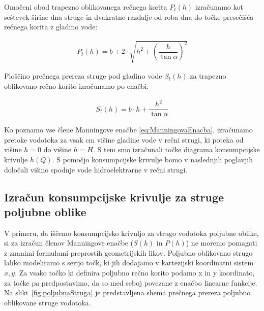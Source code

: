 \begin{enumerate}
	Omočeni obod trapezno oblikovanega rečnega korita $P_t(h)$ izračunamo kot seštevek širine dna struge in dvakratne razdalje od roba dna do točke presečišča rečnega korita z gladino vode:
	
	\begin{ceqn}
	\begin{align}
	P_{t}(h) = b + 2 \cdot \sqrt{h^2 + \left(\dfrac{h} {\tan\alpha} \right)^{2}}
	\end{align}
	\end{ceqn}
	
	Ploščino prečnega prereza struge pod gladino vode $S_t(h)$ za trapezno oblikovano rečno korito izračunamo po enačbi:
	\begin{ceqn}
	\begin{align}
	S_{t}(h) = b \cdot h + \dfrac{h^2}{\tan\alpha}
	\end{align}
	\end{ceqn}
	
\end{enumerate}



Ko poznamo vse člene Manningove enačbe \ref{eq:ManningovaEnacba}, izračunamo pretoke vodotoka za vsak cm višine gladine vode v rečni strugi, ki poteka od višine $h=0$ do višine $h=H$. S tem smo izračunali točke diagrama konsumpcijske krivulje $h(Q)$. S pomočjo konsumpcijske krivulje bomo v naslednjih poglavjih določali višino spodnje vode hidroelektrarne v rečni strugi.



\subsection{Izračun konsumpcijske krivulje za struge poljubne oblike} \label{sec:teorija_metodaPoljubnaOblika}


V primeru, da iščemo konsumpcijsko krivuljo za strugo vodotoka poljubne oblike, si za izračun členov Manningove enačbe ($S(h)$ in $P(h)$) ne moremo pomagati z znanimi formulami preprostih geometrijskih likov. Poljubno oblikovano strugo lahko modeliramo s serijo točk, ki jih dodajamo v kartezijski koordinatni sistem $x,y$. Za vsako točko ki definira poljubno rečno korito podamo x in y koordinato, za točke pa predpostavimo, da so med seboj povezane z enačbo linearne funkcije. Na sliki~\ref{fig:poljubnaStruga} je predstavljena shema prečnega prereza poljubno oblikovane struge vodotoka.

